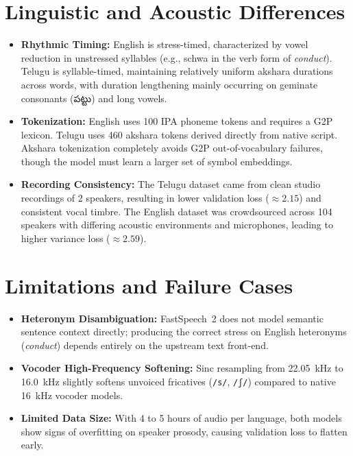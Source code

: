 \documentclass[11pt,a4paper]{report}
\newcommand{\texttelugu}[1]{{\telugufont #1}}
\begin{document}
\section{Linguistic and Acoustic Differences}
\begin{itemize}
    \item \textbf{Rhythmic Timing:} English is stress-timed, characterized by vowel reduction in unstressed syllables (e.g., schwa in the verb form of \textit{conduct}). Telugu is syllable-timed, maintaining relatively uniform akshara durations across words, with duration lengthening mainly occurring on geminate consonants (\texttelugu{పట్టు}) and long vowels.
    \item \textbf{Tokenization:} English uses 100 IPA phoneme tokens and requires a G2P lexicon. Telugu uses 460 akshara tokens derived directly from native script. Akshara tokenization completely avoids G2P out-of-vocabulary failures, though the model must learn a larger set of symbol embeddings.
    \item \textbf{Recording Consistency:} The Telugu dataset came from clean studio recordings of 2 speakers, resulting in lower validation loss ($\approx 2.15$) and consistent vocal timbre. The English dataset was crowdsourced across 104 speakers with differing acoustic environments and microphones, leading to higher variance loss ($\approx 2.59$).
\end{itemize}

\section{Limitations and Failure Cases}
\begin{itemize}
    \item \textbf{Heteronym Disambiguation:} FastSpeech~2 does not model semantic sentence context directly; producing the correct stress on English heteronyms (\textit{conduct}) depends entirely on the upstream text front-end.
    \item \textbf{Vocoder High-Frequency Softening:} Sinc resampling from 22.05~kHz to 16.0~kHz slightly softens unvoiced fricatives (\texttt{/s/}, \texttt{/ʃ/}) compared to native 16~kHz vocoder models.
    \item \textbf{Limited Data Size:} With 4 to 5 hours of audio per language, both models show signs of overfitting on speaker prosody, causing validation loss to flatten early.
\end{itemize}
\end{document}
